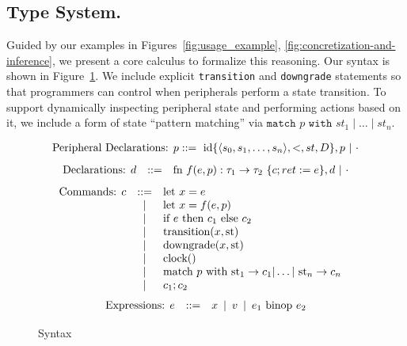 \documentclass[sigconf, nonacm, screen]{acmart}
\begin{document}
\subsection{Type System.} 
Guided by our examples in Figures~\ref{fig:usage_example}, \ref{fig:concretization-and-inference}, we present a core calculus to formalize this reasoning. Our syntax is shown in Figure~\ref{fig: syntax}. We include explicit \texttt{transition} and \texttt{downgrade} statements so that programmers can control when peripherals perform a state transition. To support dynamically inspecting peripheral state and performing actions based on it, we include a form of state ``pattern matching'' via $\texttt{match } p \texttt{ with } st_1 \mid \dots \mid st_n$. 
\begin{figure}
\small
\[
\begin{array}{lcll}
\text{Peripheral Declarations: }p ::= \ \text{id} \{\langle s_{0},s_{1},\ldots,s_{n}\rangle, <, st, D \}, p \ \vert \ \cdot 
\end{array}
\]
\[
\begin{array}{lcll}
\text{Declarations: }d & ::= & \text{fn } f(e, p): \tau_1 \rightarrow \tau_2 \ \{c; ret := e\}, d \ \vert \ \cdot
\end{array}
\]
\[
\begin{array}{lcll}
\text{Commands: }c & ::= & \text{let } x = e & \\ & \,|\, & \text{let } x = f(e, p) \\ & \,|\, & \text{if } e \text{ then } c_1 \text{ else } c_2  \\ & \,|\, & \text{transition}(x, \text{st})  \\ & \,|\, & \text{downgrade}(x, \text{st}) \\ & \,|\, & \text{clock}() \\ & \,|\, & \text{match }p \text{ with } \text{st}_1 \rightarrow c_1 | \dots | \text{ st}_n \rightarrow c_n  \\ & \,|\, & c_1; c_2 
\end{array}
\]
\[
\begin{array}{lcll}
\text{Expressions: }e & \bnfdef & x \ \bnfalt \ v \ \bnfalt \ e_1 \text{ binop } e_2 
\end{array}
\]
\caption{Syntax}
\label{fig: syntax}
\end{figure}
\end{document}
